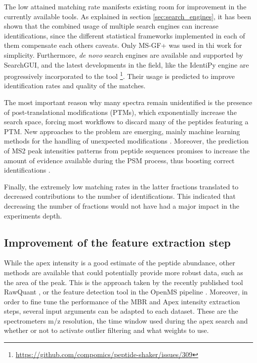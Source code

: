 The low attained matching rate manifests existing room for improvement in the currently available tools. As explained in section \ref{sec:search_engines}, it has been shown that the combined usage of multiple search engines can increase identifications, since the different statistical frameworks implemented in each of them compensate each other\textquotesingle s caveats. Only MS-GF+ was used in thi work for simplicity. Furthermore, \textit{de novo} search engines are available and supported by SearchGUI, and the latest developments in the field, like the IdentiPy engine \cite{Levitsky2018} are progressively incorporated to the tool \footnote{\href{https://github.com/compomics/peptide-shaker/issues/309}{https://github.com/compomics/peptide-shaker/issues/309}}. Their usage is predicted to improve identification rates and quality of the matches.

The most important reason why many spectra remain unidentified is the presence of post-translational modifications (\ac{PTM}s), which exponentially increase the search space, forcing most workflows to discard many of the peptides featuring a PTM. New approaches to the problem are emerging, mainly machine learning methods for the handling of unexpected modifications \cite{Gabriels}. Moreover, the prediction of \ac{MS2} peak intensities patterns from peptide sequences promises to increase the amount of evidence available during the PSM process, thus boosting correct identifications \cite{Kirik2018} \cite{Degroeve2013}.

Finally, the extremely low matching rates in the latter fractions translated to decreased contributions to the number of identifications. This indicated that decreasing the number of fractions would not have had a major impact in the experiment\textquotesingle s depth.

\subsection{Improvement of the feature extraction step}

While the apex intensity is a good estimate of the peptide abundance, other methods are available that could potentially provide more robust data, such as the area of the peak. This is the approach taken by the recently published tool RawQuant \cite{Kovalchik2018}, or the feature detection tool in the OpenMS pipeline \cite{Sturm2008}. Moreover, in order to fine tune the performance of the \ac{MBR} and Apex intensity extraction steps, several input arguments can be adapted to each dataset. These are the spectrometer\textquotesingle s \ac{m/z} resolution, the time window used during the apex search and whether or not to activate outlier filtering and what weights to use.

